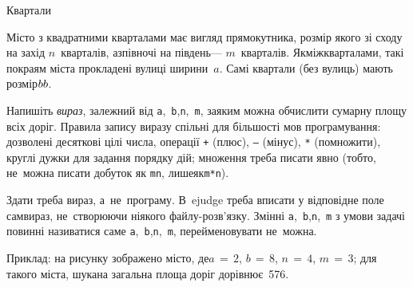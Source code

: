 \ifAfour
\myflfigaw{\hspace*{-3mm}}
\fi

{

\PrintEjudgeConstraintsfalse

\begin{problemAllDefault}{Квартали}

Місто з квадратними кварталами має вигляд прямокутника, розмір якого зі сходу на захід $n$~кварталів, а\nolinebreak[3] з\nolinebreak[3] півночі на південь\nolinebreak[3] --- $m$~кварталів. Як\nolinebreak[2] між\nolinebreak[2] кварталами, так\nolinebreak[3] і по\nolinebreak[3] краям міста прокладені вулиці ширини~$a$. Самі квартали (без вулиць) мають розмір\nolinebreak[3] $b\*b$.

Напишіть \emph{вираз}, залежний від \texttt{a},~\texttt{b},\nolinebreak[2] \texttt{n},~\texttt{m}, за\nolinebreak[3] яким можна обчислити сумарну площу всіх доріг. Правила запису виразу спільні для більшості мов програмування: дозволені десяткові цілі числа, операції \verb"+" (плюс), \verb"–" (мінус), \verb"*" (помножити), круглі дужки для задання порядку дій; множення треба писати явно (тобто, не~можна писати добуток як \verb"mn", лише\nolinebreak[2] як\nolinebreak[3] \verb"m*n").

Здати треба вираз, а~не~програму. В~ejudge треба вписати у відповідне поле сам\nolinebreak[2] вираз, не~створюючи ніякого файлу-розв’язку. Змінні \texttt{a},~\texttt{b},\nolinebreak[2] \texttt{n},~\texttt{m} з умови задачі повинні називатися саме \texttt{a},~\texttt{b},\nolinebreak[2] \texttt{n},~\texttt{m}, перейменовувати не~можна.

\ifAfour\else

\fi

Приклад: на рисунку зображено місто, де\nolinebreak[2] ${a\,{=}\,2}$, ${b\,{=}\,8}$, ${n\,{=}\,4}$, ${m\,{=}\,3}$; для такого міста, шукана загальна площа доріг дорівнює~576.

\end{problemAllDefault}

}


